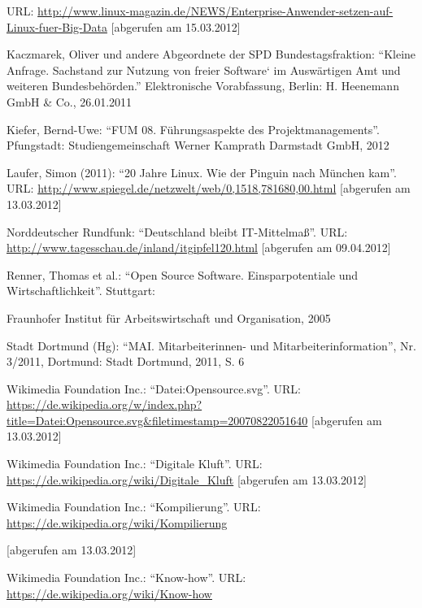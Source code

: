 \documentclass[a4paper]{scrartcl}
\begin{document}
{
{{URL:
}}\url{http://www.linux-magazin.de/NEWS/Enterprise-Anwender-setzen-auf-Linux-fuer-Big-Data}{{
}}{{[abgerufen am 15.03.2012]}}}

Kaczmarek, Oliver und andere Abgeordnete der SPD Bundestagsfraktion:
``Kleine Anfrage. Sachstand zur Nutzung von
{\quotesinglbase}freier Software{\textquoteleft} im Auswärtigen Amt
und weiteren Bundesbehörden.'' Elektronische
Vorabfassung, Berlin: H. Heenemann GmbH \& Co., 26.01.2011

{
{Kiefer,
Bernd}{{}-Uwe:}{
``}{FUM}{
}{08}{.
}{{Führungsaspekte}}{{
}}{{des}}{{
}}{{Projektmanagements}}{{''}}{{{.}}}{{{
}}}{{{Pfungstadt:}}}{{{
}}}{Studiengemeinschaft}{
}{Werner}{
}{Kamprath}{
}{Darmstadt}{
}{GmbH}{, 2012}}

{
{{Laufer, Simon (2011):
``}}{{20 Jahre
Linux}}{{{.
}}}{{Wie}}{{
}}{{der}}{{
}}{{Pinguin}}{{
}}{{nach}}{{
}}{{München}}{{
}}{{kam}}{{''.
URL:}}{{
}}\url{http://www.spiegel.de/netzwelt/web/0,1518,781680,00.html}
{{[abgerufen am 13.03.2012]}}}

{
{{{Norddeutscher
Rundfunk}}}{{:
``Deutschland bleibt IT-Mittelmaß''.
URL:
}}\url{http://www.tagesschau.de/inland/itgipfel120.html}{{
[abgerufen am 09.04.2012]}}}

{
{Renner,}{
}{Thomas}{
}{et}{
}{al.:}{
``}{Open}{
}{Source}{
}{Software}{.
}Einsparpotentiale und Wirtschaftlichkeit{\textquotedblright}.
Stuttgart: }

Fraunhofer Institut für Arbeitswirtschaft und Organisation, 2005

{
{{{Stadt}}}{{{
}}}{{{Dortmund}}}{{{
}}}{{{(Hg):}}}{{{
}}}{{``}}{{MAI}}{{{.}}}{{{
}}}{{Mitarbeiterinnen-}}{{
}}{{und}}{{
}}{{Mitarbeiterinformation}}{{{''}}}{{,}}{{
}}{{Nr.}}{{
}}{{3}}{{{/2011}}}{{,}}{{
}}{{{Dortmund:
Stadt Dortmund,
}}}{{2011,}}{{
}}{{S.}}{{
}}{{{6}}}}


{
{{Wikimedia}}{{
}}{{Foundation}}{{
}}{{Inc.:}}{{
``}}{{Datei:Opensource.svg}}{{''}}{{.}}{{
}}{{URL:}}{{
}}\url{https://de.wikipedia.org/w/index.php?title=Datei:Opensource.svg&filetimestamp=20070822051640}{{
}}{[abgerufen}{
}{am}{
}{13.03.2012]}}

{
{{Wikimedia Foundation Inc.:
``Digitale Kluft''. URL:
}}\url{https://de.wikipedia.org/wiki/Digitale_Kluft}{{
[abgerufen am 13.03.2012]}}}

{
{{Wikimedia Foundation Inc.:
``Kompilierung''. URL:
}}\url{https://de.wikipedia.org/wiki/Kompilierung}}

{
{{[abgerufen am 13.03.2012]}}}

{
{{Wikimedia Foundation Inc.:
``Know-how''. URL:
}}\url{https://de.wikipedia.org/wiki/Know-how}}
\end{document}
